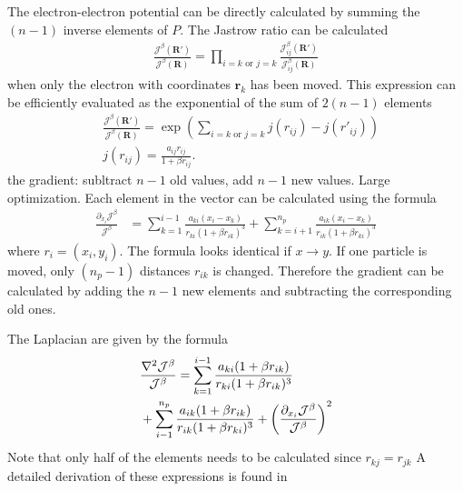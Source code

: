 \documentclass[a4paper,10pt,twocolumn]{article} %
\newcommand{\ts}[1]{\textbf{#1}}
\begin{document}
The electron-electron potential can be directly calculated by summing the $(n-1)$ inverse elements of $P$. The Jastrow ratio can be calculated
\begin{align}
	\frac{\mathcal J^\beta(\ts R')}{\mathcal J^\beta(\ts R)}
	= \prod_{i=k\text{ or }j=k} \frac{ \mathcal J_{ij}^\beta(\ts R') }{ \mathcal J_{ij}^\beta(\ts R)}
\end{align} 
when only the electron with coordinates $\ts r_k$ has been moved. This expression can be efficiently evaluated as the exponential of the sum of $2(n-1)$ elements
\begin{align}
	&\frac{\mathcal J^\beta(\ts R')}{\mathcal J^\beta(\ts R)}=
	\exp\left(\sum_{i=k\text{ or }j=k}  j(r_{ij})  - j(r'_{ij}) \right)\\
	&j(r_{ij})=\frac {a_{ij}r_{ij}}{1+\beta r_{ij}}.
\end{align}
the gradient: subltract $n-1$ old values, add $n-1$ new values. Large optimization.
Each element in the vector can be calculated using the formula
\begin{align}
	\frac{\partial_{x_i} \mathcal J^\beta}{\mathcal J^\beta}&=
	\sum_{k=1}^{i-1}\frac{a_{ki}(x_i-x_k)}{r_{ki}(1+\beta r_{ik})^3}+
	\sum_{k=i+1}^{n_p}\frac{a_{ik}(x_i-x_k)}{r_{ik}(1+\beta r_{ki})^3}
\end{align}
where $r_i=(x_i,y_i)$. The formula looks identical if $x\to y$.
If one particle is moved, only $(n_p-1)$ distances $r_{ik}$ is changed. Therefore the gradient can be calculated by adding the 
$n-1$ new elements and subtracting the corresponding old ones.

The Laplacian are given by the formula
\begin{align}
	&\frac{\nabla^2 \mathcal J^\beta}{\mathcal J^\beta}=
		\sum_{k=1}^{i-1}\frac{a_{ki}(1+\beta r_{ik})}{r_{ki}(1+\beta r_{ik})^3}\notag\\
	&+	\sum_{i-1}^{n_p}\frac{a_{ik}(1+\beta r_{ik})}{r_{ik}(1+\beta r_{ki})^3}
	+\left(\frac{\partial_{x_i} \mathcal J^\beta}{\mathcal J^\beta}\right)^2
\end{align}
Note that only half of the elements needs to be calculated since $r_{kj}=r_{jk}$
A detailed derivation of these expressions is found in \cite{lars_eivind_thesis}

\end{document}
